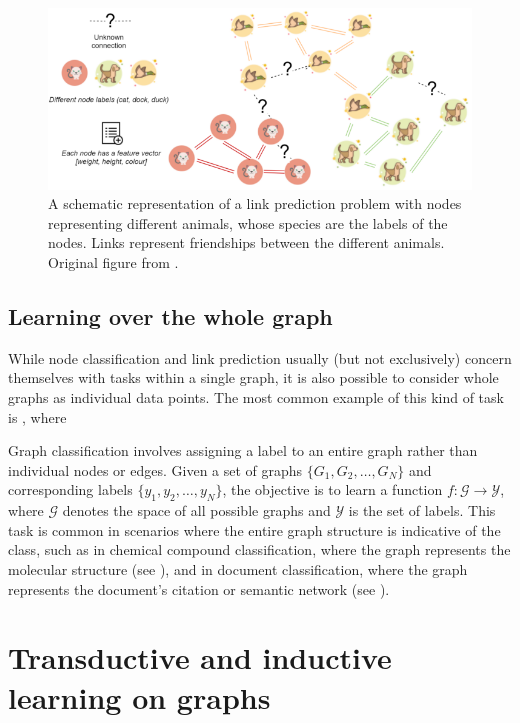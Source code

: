 \begin{figure}
	\includegraphics[width=\linewidth]{images/graph-tasks/link-prediction.png}
	\caption{A schematic representation of a link prediction problem with nodes representing different animals, whose species are the labels of the nodes. Links represent friendships between the different animals. Original figure from \cite{kubara_machine_2020}.}
	\label{fig:link-prediction}
\end{figure}

\subsection{Learning over the whole graph}

While node classification and link prediction usually (but not exclusively) concern themselves with tasks within a single graph, it is also possible to consider whole graphs as individual data points. The most common example of this kind of task is , where 

Graph classification involves assigning a label to an entire graph rather than individual nodes or edges. Given a set of graphs \( \{G_1, G_2, \ldots, G_N\} \) and corresponding labels \( \{y_1, y_2, \ldots, y_N\} \), the objective is to learn a function \( f: \mathcal{G} \rightarrow \mathcal{Y} \), where \( \mathcal{G} \) denotes the space of all possible graphs and \( \mathcal{Y} \) is the set of labels. This task is common in scenarios where the entire graph structure is indicative of the class, such as in chemical compound classification, where the graph represents the molecular structure (see \cite{duvenaud_convolutional_2015}), and in document classification, where the graph represents the document's citation or semantic network (see \cite{zhang_every_2020}).

\section{Transductive and inductive learning on graphs}

